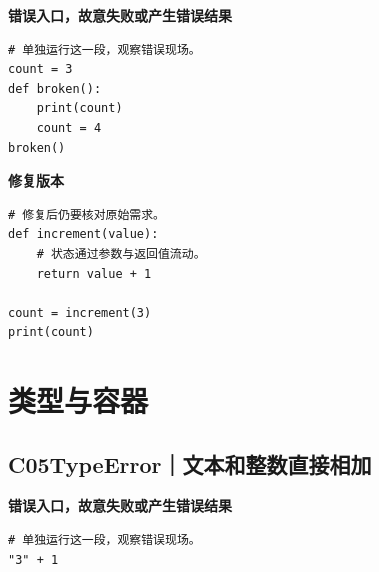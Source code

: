 



\textbf{错误入口，故意失败或产生错误结果}

\begin{lstlisting}[style=errorcode,title={错误复现（故意失败或错误结果）：\code{case_04_bad.py.txt}}]
# 单独运行这一段，观察错误现场。
count = 3
def broken():
    print(count)
    count = 4
broken()
\end{lstlisting}

\textbf{修复版本}

\begin{lstlisting}[title={\code{case_04.py}}]
# 修复后仍要核对原始需求。
def increment(value):
    # 状态通过参数与返回值流动。
    return value + 1

count = increment(3)
print(count)
\end{lstlisting}


\section{类型与容器}

\subsection*{C05\enspace TypeError｜文本和整数直接相加}





\textbf{错误入口，故意失败或产生错误结果}

\begin{lstlisting}[style=errorcode,title={错误复现（故意失败或错误结果）：\code{case_05_bad.py.txt}}]
# 单独运行这一段，观察错误现场。
"3" + 1
\end{lstlisting}

